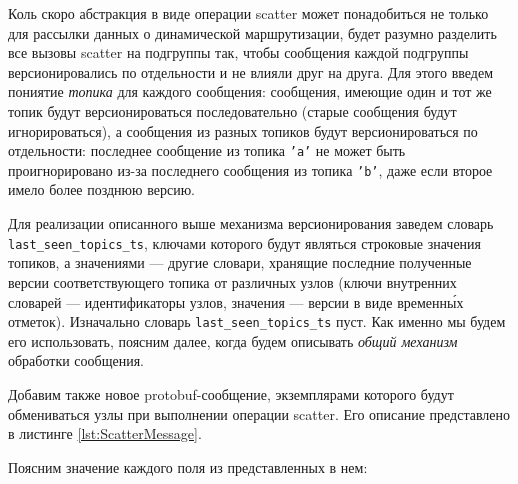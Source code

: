 \documentclass{article}
\theoremstyle{plain}
\theoremstyle{plain}
\theoremstyle{plain}
\theoremstyle{plain}
\theoremstyle{definition}
\theoremstyle{remark}
\theoremstyle{plain}
\begin{document}
Коль скоро абстракция в виде операции scatter может понадобиться не только для рассылки данных о динамической маршрутизации, будет разумно разделить все вызовы scatter на подгруппы так, чтобы сообщения каждой подгруппы версионировались по отдельности и не влияли друг на друга. Для этого введем пониятие \textit{топика} для каждого сообщения: сообщения, имеющие один и тот же топик будут версионироваться последовательно (старые сообщения будут игнорироваться), а сообщения из разных топиков будут версионироваться по отдельности: последнее сообщение из топика \texttt{'a'} не может быть проигнорировано из-за последнего сообщения из топика \texttt{'b'}, даже если второе имело более позднюю версию.

Для реализации описанного выше механизма версионирования заведем словарь \texttt{last\_seen\_to\-pics\_ts}, ключами которого будут являться строковые значения топиков, а значениями --- другие словари, хранящие последние полученные версии соответствующего топика от различных узлов (ключи внутренних словарей --- идентификаторы узлов, значения --- версии в виде временн\'{ы}х отметок). Изначально словарь \texttt{last\_seen\_to\-pics\_ts} пуст. Как именно мы будем его использовать, поясним далее, когда будем описывать \textit{общий механизм} обработки сообщения.

Добавим также новое protobuf-сообщение, экземплярами которого будут обмениваться узлы при выполнении операции scatter. Его описание представлено в листинге \ref{lst:ScatterMessage}.



Поясним значение каждого поля из представленных в нем:
\end{document}
